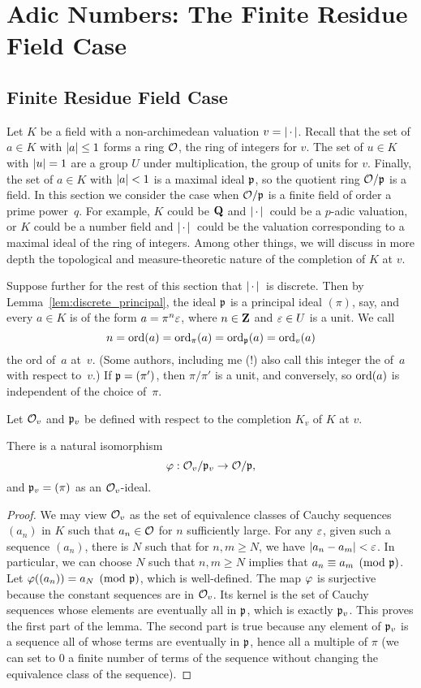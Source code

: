 \chapter{Adic Numbers: The Finite Residue Field Case}

\section{Finite Residue Field Case}
Let $K$ be a field with a non-archimedean valuation $v=\left|\,\cdot\,\right|$.
Recall that the set of $a\in K$ with $\left|a\right|\leq 1$ forms a ring
$\mathcal{O}$, the ring of integers for $v$.  The set of $u\in K$ with
$\left|u\right|=1$ are a group $U$ under multiplication, the group of units
for $v$.  Finally, the set of $a\in K$ with $\left|a\right|<1$ is a maximal
ideal $\mathfrak{p}$, so the quotient ring $\mathcal{O}/\mathfrak{p}$ is a field.  In this section
we consider the case when $\mathcal{O}/\mathfrak{p}$ is a finite field of order a prime
power~$q$.  For example, $K$ could be $\mathbf{Q}$ and $\left|\,\cdot\,\right|{}$ could be a
$p$-adic valuation, or $K$ could be a number field and $\left|\,\cdot\,\right|{}$
could be the valuation corresponding to a maximal ideal of the ring of
integers.  Among other things, we will discuss in more depth the
topological and measure-theoretic nature of the completion of $K$ at
$v$.

Suppose further for the rest of this section that $\left|\,\cdot\,\right|{}$ is
discrete.  Then by Lemma~\ref{lem:discrete_principal}, the ideal $\mathfrak{p}$
is a principal ideal $(\pi)$, say, and every $a\in K$ is of the form
$a=\pi^n\varepsilon$, where $n\in\mathbf{Z}$ and $\varepsilon\in U$ is a unit. We call
$$
n = \operatorname{ord}(a) = \operatorname{ord}_\pi(a) = \operatorname{ord}_{\mathfrak{p}}(a) = \operatorname{ord}_v(a)
$$
the ord of~$a$ at~$v$.  (Some authors, including me (!) also call
this integer the  of~$a$ with respect to~$v$.)  If
$\mathfrak{p}=(\pi')$, then $\pi/\pi'$ is a unit, and conversely, so $\operatorname{ord}(a)$
is independent of the choice of~$\pi$.

Let $\mathcal{O}_v$ and $\mathfrak{p}_v$ be defined with respect to the completion $K_v$
of $K$ at $v$.  
\begin{lemma}
There is a natural isomorphism 
$$
\varphi:\mathcal{O}_v/\mathfrak{p}_v \to \mathcal{O}/\mathfrak{p},
$$
and $\mathfrak{p}_v = (\pi)$ as an $\mathcal{O}_v$-ideal.
\end{lemma}
\begin{proof}
  We may view $\mathcal{O}_v$ as the set of equivalence classes of Cauchy
  sequences $(a_n)$ in $K$ such that $a_n\in \mathcal{O}$ for $n$ sufficiently
  large.  For any $\varepsilon$, given such a sequence $(a_n)$, there is $N$
  such that for $n,m\geq N$, we have $\left|a_n-a_m\right|<\varepsilon$.  In
  particular, we can choose $N$ such that $n,m\geq N$ implies that
  $a_n\equiv a_m\pmod{\mathfrak{p}}$.  Let $\varphi((a_n)) = a_N\pmod{\mathfrak{p}}$, which is
  well-defined.  The map $\varphi$ is surjective because the constant
  sequences are in $\mathcal{O}_v$.  Its kernel is the set of Cauchy sequences
  whose elements are eventually all in $\mathfrak{p}$, which is exactly $\mathfrak{p}_v$.
  This proves the first part of the lemma.  The second part is true
  because any element of $\mathfrak{p}_v$ is a sequence all of whose terms are
  eventually in $\mathfrak{p}$, hence all a multiple of $\pi$ (we can set to $0$
  a finite number of terms of the sequence without changing the
  equivalence class of the sequence).
\end{proof}

